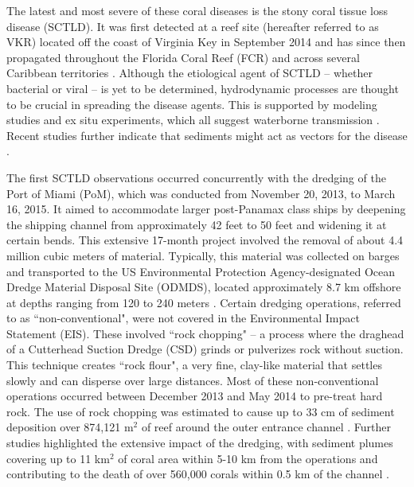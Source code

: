 \documentclass[preprint,12pt,authoryear]{elsarticle}
\begin{document}
The latest and most severe of these coral diseases is the stony coral tissue loss disease (SCTLD). It was first detected at a reef site (hereafter referred to as VKR) located off the coast of Virginia Key in September 2014 \citep{precht2016unprecedented} and has since then propagated throughout the Florida Coral Reef (FCR) and across several Caribbean territories \citep{muller2020spatial,dobbelaere2022connecting, kramer2019map, meiling2021variable, estrada2021effects,heres2021ecological}. Although the etiological agent of SCTLD -- whether bacterial or viral -- is yet to be determined, hydrodynamic processes are thought to be crucial in spreading the disease agents. This is supported by modeling studies and ex situ experiments, which all suggest waterborne transmission \citep{aeby2019pathogenesis,dobbelaere2020coupled,eaton2021measuring, meiling2021variable}. Recent studies further indicate that sediments might act as vectors for the disease \citep{rosales2020rhodobacterales, studivan2022reef}.



The first SCTLD observations occurred concurrently with the dredging of the Port of Miami (PoM), which was conducted from November 20, 2013, to March 16, 2015. It aimed to accommodate larger post-Panamax class ships by deepening the shipping channel from approximately 42 feet to 50 feet and widening it at certain bends. This extensive 17-month project involved the removal of about 4.4 million cubic meters of material. Typically, this material was collected on barges and transported to the US Environmental Protection Agency-designated Ocean Dredge Material Disposal Site (ODMDS), located approximately 8.7 km offshore at depths ranging from 120 to 240 meters \citep{noaa2023sedimentation}. Certain dredging operations, referred to as ``non-conventional", were not covered in the Environmental Impact Statement (EIS). These involved ``rock chopping" -- a process where the draghead of a Cutterhead Suction Dredge (CSD) grinds or pulverizes rock without suction. This technique creates ``rock flour", a very fine, clay-like material that settles slowly and can disperse over large distances. Most of these non-conventional operations occurred between December 2013 and May 2014 to pre-treat hard rock. The use of rock chopping was estimated to cause up to 33 cm of sediment deposition over 874,121 m$^2$ of reef around the outer entrance channel \citep{usace2017}. Further studies highlighted the extensive impact of the dredging, with sediment plumes covering up to 11 km$^2$ of coral area within 5-10 km from the operations \citep{barnes2015sediment} and contributing to the death of over 560,000 corals within 0.5 km of the channel \citep{cunning2019extensive}.
\end{document}
